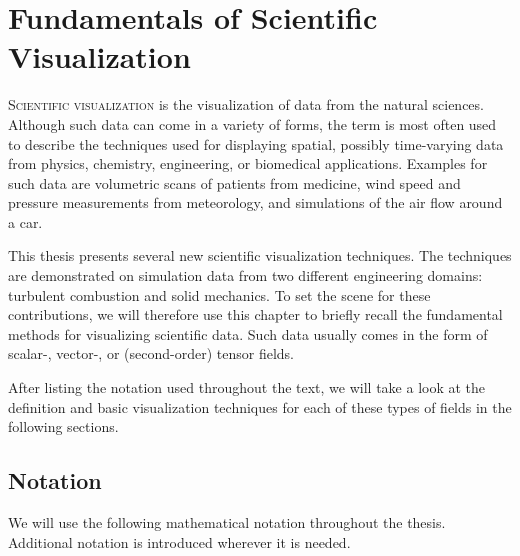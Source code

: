 \chapter{Fundamentals of Scientific Visualization} %
\label{cha:fundamentals}
%
\lettrine[lines=3, findent=-2pt, nindent=5pt, loversize=0.02]{S}{cientific
visualization} is the visualization of data from the natural sciences.
%
Although such data can come in a variety of forms, the term is most often used
to describe the techniques used for displaying spatial, possibly time-varying
data from physics, chemistry, engineering, or biomedical applications.
%
Examples for such data are volumetric scans of patients from medicine, wind
speed and pressure measurements from meteorology, and simulations of the air
flow around a car.
%

%
This thesis presents several new scientific visualization techniques.
%
The techniques are demonstrated on simulation data from two different
engineering domains: turbulent combustion and solid mechanics.
%
To set the scene for these contributions, we will therefore use this chapter to
briefly recall the fundamental methods for visualizing scientific data.
%
Such data usually comes in the form of scalar-, vector-, or (second-order)
tensor fields.
%

%
After listing the notation used throughout the text, we will take a look at the
definition and basic visualization techniques for each of these types of fields
in the following sections.
%

%
\section{Notation} %
\label{sec:notation}
%
We will use the following mathematical notation throughout the thesis.
%
Additional notation is introduced wherever it is needed.
%




